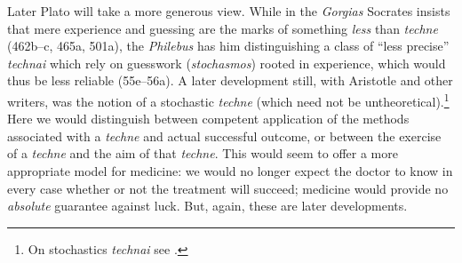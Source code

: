 ﻿\documentclass[11pt]{amsart}
\begin{document}












Later Plato will take a more generous view. While in the \emph{Gorgias} Socrates insists that mere experience and guessing are the marks of something \emph{less} than \emph{techne} (462b--c, 465a, 501a), the \emph{Philebus} has him distinguishing a class of ``less precise'' \emph{technai} which rely on guesswork (\emph{stochasmos}) rooted in experience, which would thus be less reliable (55e--56a). A later development still, with Aristotle and other writers, was the notion of a stochastic \emph{techne} (which need not be untheoretical).\footnote{On stochastics \emph{technai} see \citet[88 ff.]{allen1994}.} Here we would distinguish between competent application of the methods associated with a \emph{techne} and actual successful outcome, or between the exercise of a \emph{techne} and the aim of that \emph{techne}. This would seem to offer a more appropriate model for medicine: we would no longer expect the doctor to know in every case whether or not the treatment will succeed; medicine would provide no \emph{absolute} guarantee against luck. But, again, these are later developments.


\end{document}
